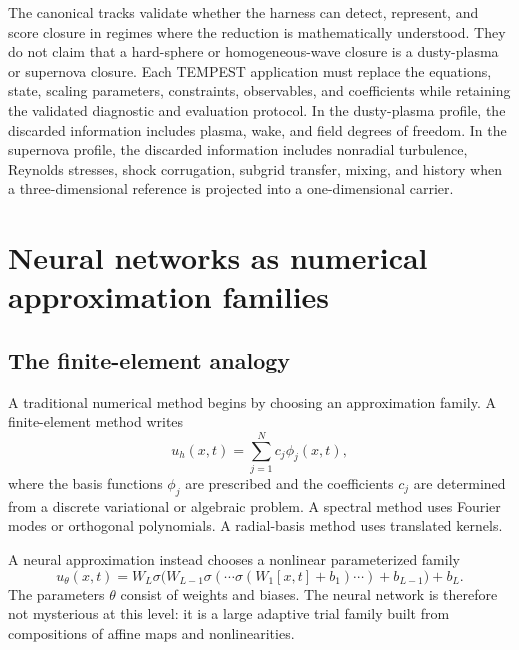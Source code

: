 \documentclass[11pt]{article}
\begin{document}
\begin{warningbox}
The canonical tracks validate whether the harness can detect, represent, and score closure in regimes where the reduction is mathematically understood. They do not claim that a hard-sphere or homogeneous-wave closure is a dusty-plasma or supernova closure. Each TEMPEST application must replace the equations, state, scaling parameters, constraints, observables, and coefficients while retaining the validated diagnostic and evaluation protocol. In the dusty-plasma profile, the discarded information includes plasma, wake, and field degrees of freedom. In the supernova profile, the discarded information includes nonradial turbulence, Reynolds stresses, shock corrugation, subgrid transfer, mixing, and history when a three-dimensional reference is projected into a one-dimensional carrier.
\end{warningbox}



\section{Neural networks as numerical approximation families}

\subsection{The finite-element analogy}

A traditional numerical method begins by choosing an approximation family. A finite-element method writes
\begin{equation}
 u_h(x,t)=\sum_{j=1}^{N}c_j\phi_j(x,t),
\end{equation}
where the basis functions \(\phi_j\) are prescribed and the coefficients \(c_j\) are determined from a discrete variational or algebraic problem. A spectral method uses Fourier modes or orthogonal polynomials. A radial-basis method uses translated kernels.

A neural approximation instead chooses a nonlinear parameterized family
\begin{equation}
 u_\theta(x,t)
= W_L\sigma\bigl(W_{L-1}\sigma(\cdots\sigma(W_1[x,t]+b_1)\cdots)+b_{L-1}\bigr)+b_L.
\end{equation}
The parameters \(\theta\) consist of weights and biases. The neural network is therefore not mysterious at this level: it is a large adaptive trial family built from compositions of affine maps and nonlinearities.
\end{document}
